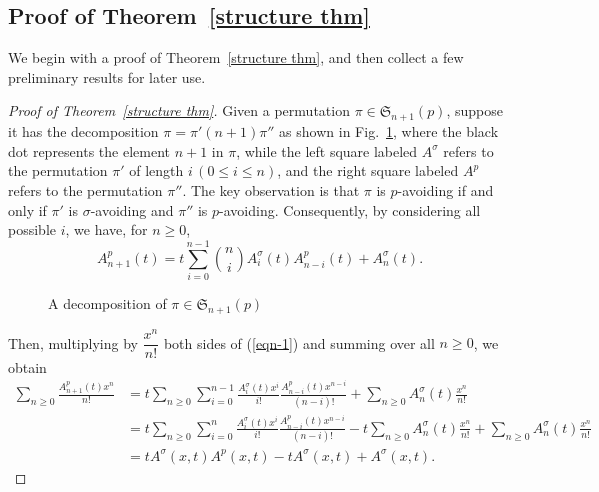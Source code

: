\documentclass[11pt,reqno]{amsart}
\numberwithin{equation}{section}
\theoremstyle{plain}
\theoremstyle{definition}
\renewcommand{\S}{\mathfrak{S}}
\begin{document}
\subsection{Proof of Theorem~\ref{structure thm}}
We begin with a proof of Theorem~\ref{structure thm}, and then collect a few preliminary results for later use.

\begin{proof}[Proof of Theorem~\ref{structure thm}]
    Given a permutation $\pi\in \S_{n+1}(p)$, suppose it has the decomposition $\pi=\pi'(n+1)\pi''$ as shown in Fig.~\ref{fig:decomposition of pi(p)}, where the black dot represents the element $n+1$ in $\pi$, while the left square labeled $A^{\sigma}$ refers to the permutation $\pi'$ of
    length $i\,(0\le i\le n)$, and the right square labeled $A^p$ refers to the permutation $\pi''$. The key observation is that $\pi$ is $p$-avoiding if and only if $\pi'$ is $\sigma$-avoiding and $\pi''$ is $p$-avoiding. Consequently, by considering all possible $i$, we have, for $n\ge 0$,
    \begin{equation}\label{eqn-1}
    A_{n+1}^p(t)=t\sum_{i=0}^{n-1}\binom{n}{i}A_i^{\sigma}(t)A_{n-i}^p(t)+A_n^{\sigma}(t).\end{equation}

    \begin{figure}[ht]
        \centering
        \caption{A decomposition of $\pi \in \S_{n+1}(p)$}
        \label{fig:decomposition of pi(p)}
    \end{figure}

\noindent
Then, multiplying by $\dfrac{x^n}{n!}$ both sides of (\ref{eqn-1}) and summing over all $n\geq 0$, we obtain
    \begin{align*}
        \sum_{n\ge 0}\frac{A_{n+1}^p(t)x^n}{n!} &= t\sum_{n\ge 0}\sum_{i=0}^{n-1}\frac{A_i^{\sigma}(t)x^i}{i!}\frac{A_{n-i}^p(t)x^{n-i}}{(n-i)!}+\sum_{n\ge 0}A_n^{\sigma}(t)\frac{x^n}{n!} \\
        &= t\sum_{n\ge 0}\sum_{i=0}^{n}\frac{A_i^{\sigma}(t)x^i}{i!}\frac{A_{n-i}^p(t)x^{n-i}}{(n-i)!}-t\sum_{n\ge0}A_n^{\sigma}(t)\frac{x^n}{n!}+\sum_{n\ge 0}A_n^{\sigma}(t)\frac{x^n}{n!} \\
        &= tA^{\sigma}(x,t)A^p(x,t) -tA^{\sigma}(x,t)+A^{\sigma}(x,t).
    \end{align*}


\end{proof}
\end{document}
